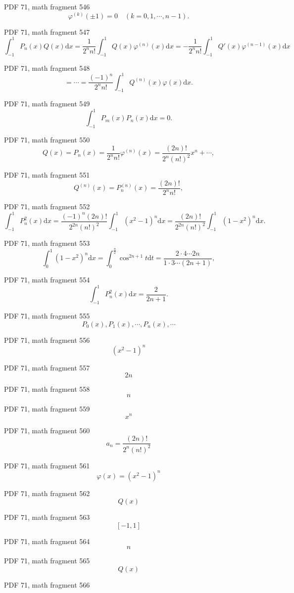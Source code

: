 \documentclass[UTF8,fontset=fandol]{ctexart}
\begin{document}
\par
PDF 71, math fragment 546
\[
\varphi^{(k)}(\pm 1) = 0 \quad (k = 0, 1, \cdots, n - 1).
\]
\par
PDF 71, math fragment 547
\[
\int_{-1}^{1} P_n(x) Q(x) \mathrm{d}x = \frac{1}{2^n n!} \int_{-1}^{1} Q(x) \varphi^{(n)}(x) \mathrm{d}x = -\frac{1}{2^n n!} \int_{-1}^{1} Q'(x) \varphi^{(n-1)}(x) \mathrm{d}x
\]
\par
PDF 71, math fragment 548
\[
= \cdots = \frac{(-1)^n}{2^n n!} \int_{-1}^{1} Q^{(n)}(x) \varphi(x) \mathrm{d}x.
\]
\par
PDF 71, math fragment 549
\[
\int_{-1}^{1} P_m(x) P_n(x) \mathrm{d}x = 0.
\]
\par
PDF 71, math fragment 550
\[
Q(x) = P_n(x) = \frac{1}{2^n n!} \varphi^{(n)}(x) = \frac{(2n)!}{2^n (n!)^2} x^n + \cdots,
\]
\par
PDF 71, math fragment 551
\[
Q^{(n)}(x) = P_n^{(n)}(x) = \frac{(2n)!}{2^n n!},
\]
\par
PDF 71, math fragment 552
\[
\int_{-1}^{1} P_n^2(x) \mathrm{d}x = \frac{(-1)^n (2n)!}{2^{2n} (n!)^2} \int_{-1}^{1} (x^2 - 1)^n \mathrm{d}x = \frac{(2n)!}{2^{2n} (n!)^2} \int_{-1}^{1} (1 - x^2)^n \mathrm{d}x.
\]
\par
PDF 71, math fragment 553
\[
\int_{0}^{1} (1 - x^2)^n \mathrm{d}x = \int_{0}^{\frac{\pi}{2}} \cos^{2n+1} t \mathrm{d}t = \frac{2 \cdot 4 \cdots 2n}{1 \cdot 3 \cdots (2n+1)},
\]
\par
PDF 71, math fragment 554
\[
\int_{-1}^{1} P_n^2(x) \mathrm{d}x = \frac{2}{2n+1}.
\]
\par
PDF 71, math fragment 555
\[P_0(x), P_1(x), \cdots, P_n(x), \cdots\]
\par
PDF 71, math fragment 556
\[(x^2 - 1)^n\]
\par
PDF 71, math fragment 557
\[2n\]
\par
PDF 71, math fragment 558
\[n\]
\par
PDF 71, math fragment 559
\[x^n\]
\par
PDF 71, math fragment 560
\[a_n = \frac{(2n)!}{2^n (n!)^2}\]
\par
PDF 71, math fragment 561
\[\varphi(x) = (x^2 - 1)^n\]
\par
PDF 71, math fragment 562
\[Q(x)\]
\par
PDF 71, math fragment 563
\[[-1, 1]\]
\par
PDF 71, math fragment 564
\[n\]
\par
PDF 71, math fragment 565
\[Q(x)\]
\par
PDF 71, math fragment 566
\end{document}
